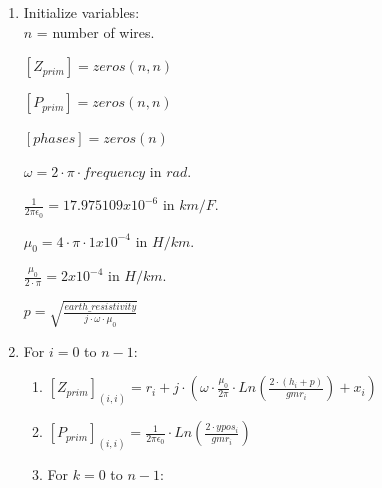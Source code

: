 \documentclass[nols,a4paper,twoside,notoc,fleqn]{tufte-book}
\begin{document}
\begin{enumerate}
	
	
	\item Initialize variables: \\
	
	$n$ = number of wires. \\
	\vspace{0.1 cm}
	
	$\left[Z_{prim} \right]= zeros(n, n)$ \\
	\vspace{0.1 cm}
	
	$\left[P_{prim}\right] = zeros(n, n)$ \\
	\vspace{0.1 cm}
	
	$\left[phases\right] = zeros(n)$ \\
	\vspace{0.1 cm}
	
	$\omega = 2 \cdot \pi \cdot frequency$ in $rad$.
	\vspace{0.1 cm}
	
	$\frac{1}{2 \pi \epsilon_0} = 17.975109x10^{-6}$ in $km/F$. \\
	\vspace{0.1 cm}
	
	$\mu_0 = 4 \cdot \pi \cdot 1x10^{-4}$ in $H/km$. \\
	\vspace{0.1 cm}
	
	$\frac{\mu_0}{2 \cdot \pi} = 2x10^{-4}$  in $H/km$. \\
	\vspace{0.1 cm}
	
	$p = \sqrt{\frac{earth\_resistivity}{j \cdot \omega \cdot \mu_0}}$ \\
	\vspace{0.1 cm}
	
	\item For $i=0$ to $n-1$:
		
	\begin{enumerate}
		
		\item $\left[Z_{prim}\right]_{(i, i)}= r_i + j \cdot \left(\omega \cdot \frac{ \mu_0}{2 \pi} \cdot Ln \left(\frac{2 \cdot (h_i + p)}{gmr_i} \right) + x_i \right)$
		
		\item $\left[P_{prim}\right]_{(i,i)} = \frac{1}{2 \pi \epsilon_0} \cdot Ln \left( \frac{2 \cdot ypos_i}{ gmr_i} \right)$
		
		\item For $k=0$ to $n-1$: 
		

\end{enumerate}
\end{enumerate}
\end{document}
